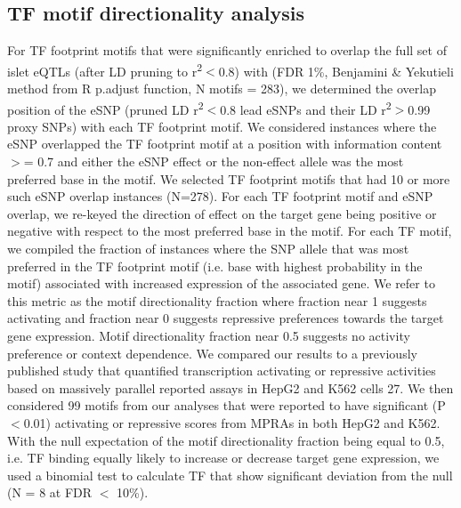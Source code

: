 \subsection{TF motif directionality analysis}
For TF footprint motifs that were significantly enriched to overlap the full set of islet eQTLs (after LD pruning to r\textsuperscript{2}$<$0.8) with (FDR 1\%, Benjamini \& Yekutieli method from R p.adjust function, N motifs = 283), we determined the overlap position of the eSNP (pruned LD r\textsuperscript{2}$<$0.8 lead eSNPs and their LD r\textsuperscript{2}$>$0.99 proxy SNPs) with each TF footprint motif. We considered instances where the eSNP overlapped the TF footprint motif at a position with information content $>$= 0.7 and either the eSNP effect or the non-effect allele was the most preferred base in the motif. We selected TF footprint motifs that had 10 or more such eSNP overlap instances (N=278). For each TF footprint motif and eSNP overlap, we re-keyed the direction of effect on the target gene being positive or negative with respect to the most preferred base in the motif. For each TF motif, we compiled the fraction of instances where the SNP allele that was most preferred in the TF footprint motif (i.e. base with highest probability in the motif) associated with increased expression of the associated gene. We refer to this metric as the motif directionality fraction where fraction near 1 suggests activating and fraction near 0 suggests repressive preferences towards the target gene expression. Motif directionality fraction near 0.5 suggests no activity preference or context dependence.
We compared our results to a previously published study that quantified transcription activating or repressive activities based on massively parallel reported assays in HepG2 and K562 cells 27. We then considered 99 motifs from our analyses that were reported to have significant (P$<$0.01) activating or repressive scores from MPRAs in both HepG2 and K562. With the null expectation of the motif directionality fraction being equal to 0.5, i.e. TF binding equally likely to increase or decrease target gene expression, we used a binomial test to calculate TF that show significant deviation from the null (N = 8 at FDR $<$ 10\%).

